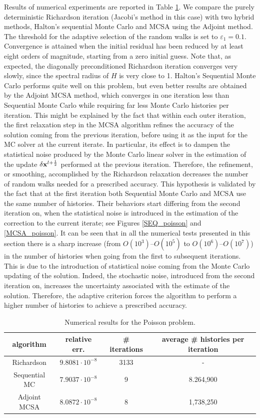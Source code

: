 \documentclass[times]{nlaauth}
\begin{document}
Results of numerical experiments are reported in Table \ref{Poisson_results}.
We compare the purely deterministic Richardson iteration (Jacobi's method
in this case) with two hybrid
methods, Halton's
sequential Monte Carlo and MCSA using the Adjoint method.
The threshold
for the adaptive selection of the random walks is set
to $\varepsilon_1=0.1$.
Convergence is attained when the initial residual has been reduced
by at least eight orders of magnitude, starting from a zero initial guess.
Note that, as expected, the diagonally preconditioned Richardson iteration
converges very slowly, since the spectral radius of $H$ is very close to 1.
Halton's Sequential Monte Carlo performs quite well on this problem, but
even better results are obtained by the Adjoint MCSA method, which converges
in one iteration less than Sequential Monte Carlo while requiring far less
Monte Carlo histories per iteration.
 This
might be explained by the fact that within each outer
iteration, the first relaxation step
in the MCSA algorithm refines the accuracy of the solution coming from the previous
iteration,
before using it as the input for the MC solver at the current iterate.
In particular,
its effect is to dampen the statistical noise
produced by the Monte Carlo linear solver in the estimation of the update $\delta
{\bf x}^{l + \frac{1}{2}}$ performed at the previous iteration. Therefore, the refinement,
or smoothing, accomplished by the Richardson relaxation decreases the number of
random walks needed
for a prescribed accuracy. This hypothesis is validated by the fact
that at the first iteration both Sequential Monte Carlo and MCSA use
the same number of histories. Their behaviors start differing from the
second iteration on, when the statistical noise is introduced in the estimation
of the correction to the current iterate;
see Figures \ref{SEQ_poisson} and
\ref{MCSA_poisson}.
It can be seen that
in all the numerical tests presented in this section there is a sharp increase
(from $O(10^3)$--$O(10^5)$ to $O(10^6)$--$O(10^7)$)
in the number of histories when going from the first to subsequent iterations.
This is due to the introduction of statistical noise coming from the Monte Carlo
updating of the solution. Indeed, the stochastic noise, introduced from the
second iteration on, increases the uncertainty associated with the estimate
of the solution. Therefore, the adaptive criterion forces the algorithm
to perform a higher number of histories
to achieve a prescribed accuracy.

\begin{table}[!t]
\centering
\hspace*{-0.8cm}
\begin{tabular}{|c|c|c|c|}
\hline
algorithm & relative err.& \# iterations & average \# histories per iteration\\
\hline
Richardson & $9.8081\cdot 10^{-8}$ & 3133 & - \\
\hline
Sequential MC & $7.9037 \cdot 10^{-8}$ & 9 & 8.264,900\\
\hline
 Adjoint MCSA & $8.0872\cdot 10^{-8}$ & 8 & 1,738,250\\
\hline
\end{tabular}
\caption{Numerical results for the Poisson problem.}
\label{Poisson_results}
\end{table}
\end{document}

